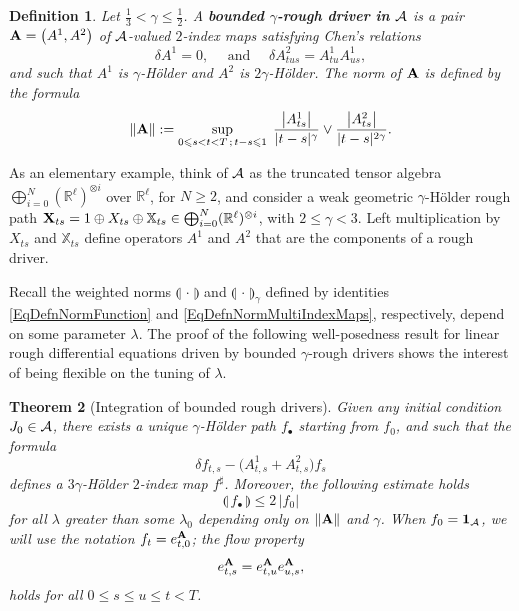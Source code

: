 \documentclass[11pt,a4paper]{amsart}
\newcommand{\RR}{\mathbb{R}}  \newcommand{\CC}{\mathbb{C}}  \newcommand{\LL}{\mathbb{L}}  \newcommand{\WW}{\mathbb{W}}
\newcommand{\bbX}{\mathbb{X}}
\renewcommand{\leq}{\leqslant}
\renewcommand{\geq}{\geqslant}
\newtheorem{thm}{\hspace{-0.15cm}  {\sc Theorem} } %
\newtheorem{defn}[thm]{ \hspace{-0.3cm} {\sc Definition}}%
\numberwithin{equation}{section} %
\begin{document}
\begin{defn}
Let $\frac{1}{3}<\gamma\leq \frac{1}{2}$. A \textbf{\emph{bounded $\gamma$-rough driver in $\mathcal{A}$}} is a pair ${\bf A}= \big(A^1,A^2\big)$ of $\mathcal{A}$-valued $2$-index maps satisfying \emph{Chen's relations}
\begin{equation}
\label{EqChenRelations}
\delta A^1=0, \quad \textrm{ and }\quad \delta A^2_{tus} = A^1_{tu}A^1_{us},
\end{equation}
and such that $A^1$ is $\gamma$-H\"older and $A^2$ is $2\gamma$-H\"older. The norm of $\bf A$ is defined by the formula
$$
\| {\bf A} \| := \sup_{0\leq s<t<T\,;\,t-s\leq 1}\;\frac{\big|A^1_{ts}\big|}{|t-s|^\gamma}\vee\frac{\big|A^2_{ts}\big|}{|t-s|^{2\gamma}}.
$$
\end{defn}

\medskip

As an elementary example, think of $\mathcal{A}$ as the truncated tensor algebra $\bigoplus_{i=0}^N(\RR^\ell)^{\otimes i}$ over $\RR^\ell$, for $N\geq 2$, and consider a weak geometric $\gamma$-H\"older rough path ${\bfX}_{ts} = 1\oplus X_{ts}\oplus \bbX_{ts}\in\bigoplus_{i=0}^N(\RR^\ell)^{\otimes i}$, with $2\leq \gamma<3$. Left multiplication by $X_{ts}$ and $\bbX_{ts}$ define operators $A^1$ and $A^2$ that are the components of a rough driver.

\medskip

Recall the weighted norms $\llparenthesis\,\cdot\,\rrparenthesis$ and $\llparenthesis\,\cdot\,\rrparenthesis_\gamma$ defined by identities \eqref{EqDefnNormFunction} and \eqref{EqDefnNormMultiIndexMaps}, respectively, depend on some parameter $\lambda$. The proof of the following well-posedness result for linear rough differential equations driven by bounded $\gamma$-rough drivers shows the interest of being flexible on the tuning of $\lambda$.

\begin{thm}[Integration of bounded rough drivers]
\label{ThmIntegrationLinearBounded}
Given any initial condition $J_0\in\mathcal{A}$, there  exists a unique $\gamma$-H\"older path $f_\bullet$ starting from $f_0$, and such that the formula 
  \begin{equation*}
    \delta f_{t, s} - \Big(A^1_{t, s} +A^2_{t, s}\Big) f_s 
  \end{equation*}
defines a $3\gamma$-H\"older $2$-index map $f^\sharp$. Moreover, the following estimate holds
  \begin{equation}
  \label{EqLinearBound}
    \llparenthesis\, f_\bullet \,\rrparenthesis \leqslant 2\,\big| f_0 \big|
  \end{equation}
for all $\lambda$ greater than some $\lambda_0$ depending only on $\| \bf A \|$ and $\gamma$. When $f_0  ={\bf 1}_{\mathcal{A}}$, we will use the notation $ f_t =e^{\bf A}_{t,0}$; the flow property
$$
e^{\bf A}_{t, s} = e^{\bf A}_{t, u} e^{\bf A}_{u, s},
$$
holds for all $0\leq s\leq u\leq t<T$.
\end{thm}
\end{document}
